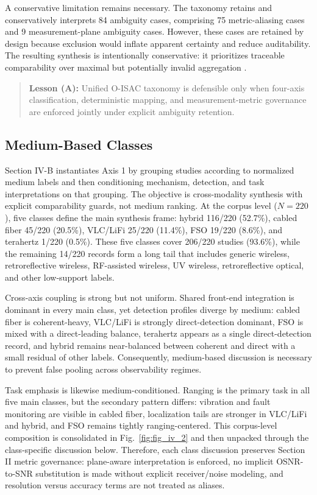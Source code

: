 \documentclass[lettersize,journal]{IEEEtran}
\begin{document}
A conservative limitation remains necessary. The taxonomy retains and conservatively interprets 84 ambiguity cases, comprising 75 metric-aliasing cases and 9 measurement-plane ambiguity cases. However, these cases are retained by design because exclusion would inflate apparent certainty and reduce auditability. The resulting synthesis is intentionally conservative: it prioritizes traceable comparability over maximal but potentially invalid aggregation \cite{O_ISAC_021,O_ISAC_039,O_ISAC_077}.

\begin{quote}
\textbf{Lesson (A):} Unified O-ISAC taxonomy is defensible only when four-axis classification, deterministic mapping, and measurement-metric governance are enforced jointly under explicit ambiguity retention.
\end{quote}

\subsection{Medium-Based Classes}
Section IV-B instantiates Axis 1 by grouping studies according to normalized medium labels and then conditioning mechanism, detection, and task interpretations on that grouping. The objective is cross-modality synthesis with explicit comparability guards, not medium ranking. At the corpus level ($N=220$), five classes define the main synthesis frame: hybrid 116/220 (52.7\%), cabled fiber 45/220 (20.5\%), VLC/LiFi 25/220 (11.4\%), FSO 19/220 (8.6\%), and terahertz 1/220 (0.5\%). These five classes cover 206/220 studies (93.6\%), while the remaining 14/220 records form a long tail that includes generic wireless, retroreflective wireless, RF-assisted wireless, UV wireless, retroreflective optical, and other low-support labels.

Cross-axis coupling is strong but not uniform. Shared front-end integration is dominant in every main class, yet detection profiles diverge by medium: cabled fiber is coherent-heavy, VLC/LiFi is strongly direct-detection dominant, FSO is mixed with a direct-leading balance, terahertz appears as a single direct-detection record, and hybrid remains near-balanced between coherent and direct with a small residual of other labels. Consequently, medium-based discussion is necessary to prevent false pooling across observability regimes.

Task emphasis is likewise medium-conditioned. Ranging is the primary task in all five main classes, but the secondary pattern differs: vibration and fault monitoring are visible in cabled fiber, localization tails are stronger in VLC/LiFi and hybrid, and FSO remains tightly ranging-centered. This corpus-level composition is consolidated in Fig.~\ref{fig:fig_iv_2} and then unpacked through the class-specific discussion below. Therefore, each class discussion preserves Section II metric governance: plane-aware interpretation is enforced, no implicit OSNR-to-SNR substitution is made without explicit receiver/noise modeling, and resolution versus accuracy terms are not treated as aliases.
\end{document}
